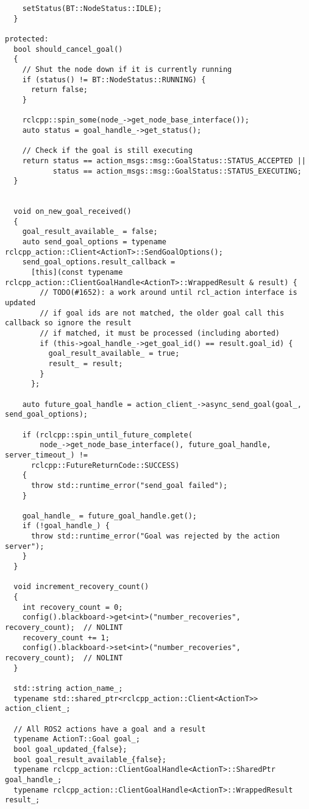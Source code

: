 \begin{tcolorbox}[sharp corners, colframe=gray!80, colback=LightGray, left=0pt, top=0pt, bottom=0pt, title=\texttt{br2\_bt\_patrolling/include/br2\_bt\_patrolling/ctrl\_support/BTActionNode.hpp}]
\begin{verbatim}
    setStatus(BT::NodeStatus::IDLE);
  }

protected:
  bool should_cancel_goal()
  {
    // Shut the node down if it is currently running
    if (status() != BT::NodeStatus::RUNNING) {
      return false;
    }

    rclcpp::spin_some(node_->get_node_base_interface());
    auto status = goal_handle_->get_status();

    // Check if the goal is still executing
    return status == action_msgs::msg::GoalStatus::STATUS_ACCEPTED ||
           status == action_msgs::msg::GoalStatus::STATUS_EXECUTING;
  }


  void on_new_goal_received()
  {
    goal_result_available_ = false;
    auto send_goal_options = typename rclcpp_action::Client<ActionT>::SendGoalOptions();
    send_goal_options.result_callback =
      [this](const typename rclcpp_action::ClientGoalHandle<ActionT>::WrappedResult & result) {
        // TODO(#1652): a work around until rcl_action interface is updated
        // if goal ids are not matched, the older goal call this callback so ignore the result
        // if matched, it must be processed (including aborted)
        if (this->goal_handle_->get_goal_id() == result.goal_id) {
          goal_result_available_ = true;
          result_ = result;
        }
      };

    auto future_goal_handle = action_client_->async_send_goal(goal_, send_goal_options);

    if (rclcpp::spin_until_future_complete(
        node_->get_node_base_interface(), future_goal_handle, server_timeout_) !=
      rclcpp::FutureReturnCode::SUCCESS)
    {
      throw std::runtime_error("send_goal failed");
    }

    goal_handle_ = future_goal_handle.get();
    if (!goal_handle_) {
      throw std::runtime_error("Goal was rejected by the action server");
    }
  }

  void increment_recovery_count()
  {
    int recovery_count = 0;
    config().blackboard->get<int>("number_recoveries", recovery_count);  // NOLINT
    recovery_count += 1;
    config().blackboard->set<int>("number_recoveries", recovery_count);  // NOLINT
  }

  std::string action_name_;
  typename std::shared_ptr<rclcpp_action::Client<ActionT>> action_client_;

  // All ROS2 actions have a goal and a result
  typename ActionT::Goal goal_;
  bool goal_updated_{false};
  bool goal_result_available_{false};
  typename rclcpp_action::ClientGoalHandle<ActionT>::SharedPtr goal_handle_;
  typename rclcpp_action::ClientGoalHandle<ActionT>::WrappedResult result_;


\end{verbatim}
\end{tcolorbox}
